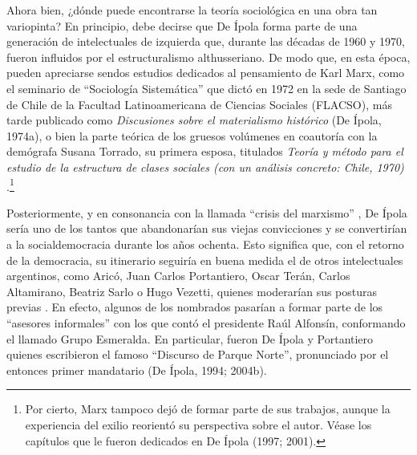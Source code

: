 Ahora bien, ¿dónde puede encontrarse la teoría sociológica en una obra tan variopinta? En principio, debe decirse que De Ípola forma parte de una generación de intelectuales de izquierda que, durante las décadas de 1960 y 1970, fueron influidos por el estructuralismo althusseriano. De modo que, en esta época, pueden apreciarse sendos estudios dedicados al pensamiento de Karl Marx, como el seminario de \enquote{Sociología Sistemática} que dictó en 1972 en la sede de Santiago de Chile de la Facultad Latinoamericana de Ciencias Sociales (FLACSO), más tarde publicado como \emph{Discusiones sobre el materialismo histórico} (De Ípola, 1974a), o bien la parte teórica de los gruesos volúmenes en coautoría con la demógrafa Susana Torrado, su primera esposa, titulados \emph{Teoría y método para el estudio de la estructura de clases sociales (con un análisis concreto: Chile, 1970)} \parencite{1505-TORRADO1976}.\footnote{Por cierto, Marx tampoco dejó de formar parte de sus trabajos, aunque la experiencia del exilio reorientó su perspectiva sobre el autor. Véase los capítulos que le fueron dedicados en De Ípola (1997; 2001).}

Posteriormente, y en consonancia con la llamada \enquote{crisis del marxismo} \parencite{279-ANDERSON2011}, De Ípola sería uno de los tantos que abandonarían sus viejas convicciones y se convertirían a la socialdemocracia durante los años ochenta. Esto significa que, con el retorno de la democracia, su itinerario seguiría en buena medida el de otros intelectuales argentinos, como Aricó, Juan Carlos Portantiero, Oscar Terán, Carlos Altamirano, Beatriz Sarlo o Hugo Vezetti, quienes moderarían sus posturas previas \parencite{1446-BURGOS2004}. En efecto, algunos de los nombrados pasarían a formar parte de los \enquote{asesores informales} con los que contó el presidente Raúl Alfonsín, conformando el llamado Grupo Esmeralda. En particular, fueron De Ípola y Portantiero quienes escribieron el famoso \enquote{Discurso de Parque Norte}, pronunciado por el entonces primer mandatario \parencite{1525-RINESI2004}(De Ípola, 1994; 2004b).

